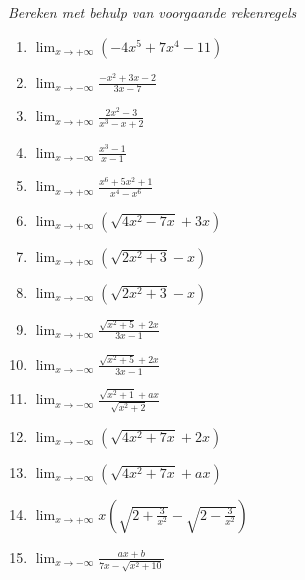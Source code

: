 \documentclass[numbers]{ximera}
\begin{document}
\begin{exercise}
	\textit{Bereken met behulp van voorgaande rekenregels}
	\begin{enumerate}
		\renewcommand{\labelenumi}{(\alph{enumi})}
		\item $\displaystyle{\lim_{x \rightarrow + \infty}} (-4x^5 + 7x^4 -
		11)$
		\item $\displaystyle{\lim_{x \rightarrow - \infty}} \frac{-x^2 + 3x
			- 2}{3x-7}$
		\item $\displaystyle{\lim_{x \rightarrow + \infty}} \frac{2x^2 -
			3}{x^3 - x + 2}$
		\item $\displaystyle{\lim_{x \rightarrow - \infty}} \frac{x^3 -
			1}{x - 1}$
		\item $\displaystyle{\lim_{x \rightarrow + \infty}} \frac{x^6 +
			5x^2 + 1}{x^4 - x^6}$
		\item $\displaystyle{\lim_{x \rightarrow + \infty}} (\sqrt{4x^2 - 7x} + 3x)$
		\item $\displaystyle{\lim_{x \rightarrow + \infty}} (\sqrt{2 x^2 + 3} - x)$
		\item $\displaystyle{\lim_{x \rightarrow - \infty}} (\sqrt{2 x^2 + 3} - x)$
		\item $\displaystyle{\lim_{x \rightarrow + \infty}} \frac{\sqrt{x^2 + 5} + 2x}{3x-1}$
		\item $\displaystyle{\lim_{x \rightarrow - \infty}} \frac{\sqrt{x^2 + 5} + 2x}{3x-1}$
		\item $\displaystyle{\lim_{x \rightarrow - \infty}} \frac{\sqrt{x^2+1} + ax}{\sqrt{x^2+2}}$
		\item $\displaystyle{\lim_{x \rightarrow - \infty}} (\sqrt{4x^2 + 7x} +
		2x)$  
		\item $\displaystyle{\lim_{x \rightarrow - \infty}} (\sqrt{4x^2 + 7x} +
		ax)$  
		\item $\displaystyle{\lim_{x \rightarrow + \infty}} x(\sqrt{2+ \frac{3}{x^2}} - \sqrt{2- \frac{3}{x^2}})$
		\item $\displaystyle{\lim_{x \rightarrow - \infty}} \frac{ax + b}{7x- \sqrt{x^2 + 10}}$
	\end{enumerate}
\begin{comment}  %
	\begin{oplossing}
		\begin{enumerate}
			\renewcommand{\labelenumi}{(\alph{enumi})}
			\item $\displaystyle{\lim_{x \rightarrow + \infty}} (-4x^5 + 7x^4 -	11) = - \infty$
			\item $\displaystyle{\lim_{x \rightarrow - \infty}} \frac{-x^2 + 3x	- 2}{3x-7} = + \infty$

\end{comment}
\end{exercise}
\end{document}
